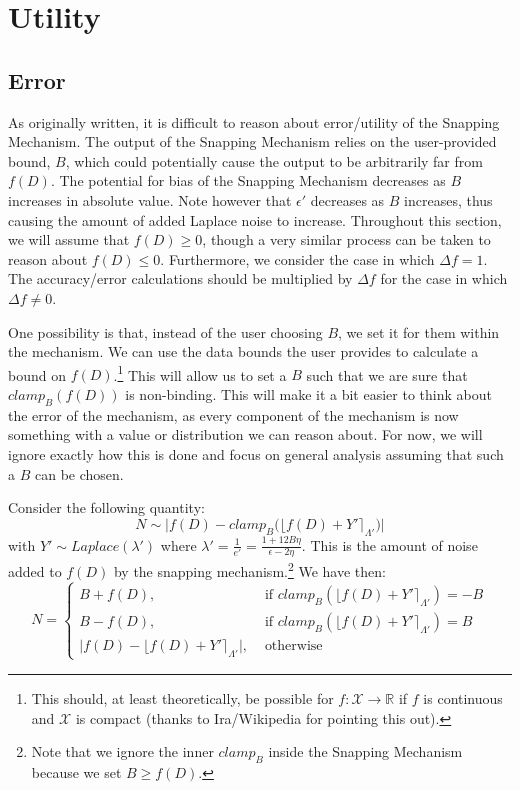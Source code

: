 \documentclass[11pt]{scrartcl} %
\begin{document}
\section{Utility}
\subsection{Error}
As originally written, it is difficult to reason about error/utility of the Snapping Mechanism. The output of the Snapping Mechanism relies on the user-provided bound, $B$, which could potentially cause the output to be arbitrarily far from $f(D)$. The potential for bias of the Snapping Mechanism decreases as $B$ increases in absolute value. Note however that $\epsilon'$ decreases as $B$ increases, thus causing the amount of added Laplace noise to increase. Throughout this section, we will assume that $f(D) \geq 0$, though a very similar process can be taken to reason about $f(D) \leq 0$. Furthermore, we consider the case in which $\Delta f = 1$.
The accuracy/error calculations should be multiplied by $\Delta f$ for the case in which $\Delta f \neq 0$. \newline

One possibility is that, instead of the user choosing $B$, we set it for them within the mechanism. We can use the data bounds the user provides to calculate a bound on $f(D)$.\footnote{This should, at least theoretically, be possible for $f: \mathcal{X} \rightarrow \mathbb{R}$ if $f$ is continuous and $\mathcal{X}$ is compact (thanks to Ira/Wikipedia for pointing this out).} This will allow us to set a $B$ such that we are sure that $clamp_B \left( f(D) \right)$ is non-binding. This will make it a bit easier to think about the error of the mechanism, as every component of the mechanism is now something with a value or distribution we can reason about.
For now, we will ignore exactly how this is done and focus on general analysis assuming that such a $B$ can be chosen.

Consider the following quantity:
\[ N \sim \big \vert f(D) - clamp_B \big( \lfloor f(D) + Y' \rceil_{\Lambda'} \big) \big \vert \]
with $Y' \sim Laplace(\lambda')$ where $\lambda' = \frac{1}{e'} = \frac{1 + 12B \eta}{\epsilon - 2\eta}$. This is the amount of noise added to $f(D)$ by the snapping mechanism.\footnote{Note that we ignore the inner $clamp_B$ inside the Snapping Mechanism because we set $B \geq f(D)$.} We have then:
\begin{equation}
	N =
		\label{snapped_noise}
		\begin{cases}
			B + f(D), &\text{ if } clamp_B \left( \lfloor f(D) + Y' \rceil_{\Lambda'} \right) = -B  \\
			B - f(D), &\text{ if } clamp_B \left( \lfloor f(D) + Y' \rceil_{\Lambda'} \right) = B  \\
			\big\vert f(D) - \lfloor f(D) + Y' \rceil_{\Lambda'} \big\vert, &\text{ otherwise }
		\end{cases}
\end{equation}
\end{document}
